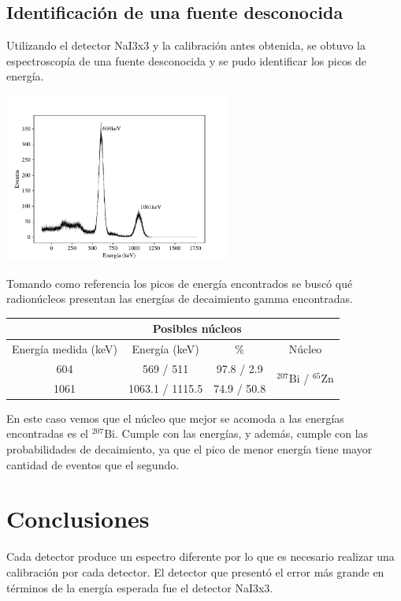 \documentclass[a4paper, onecolumn]{article}
\begin{document}
		\subsection{Identificación de una fuente desconocida}
		Utilizando el detector NaI3x3 y la calibración antes obtenida, se obtuvo la espectroscopía de una fuente desconocida y se pudo identificar los picos de energía.
		\begin{center}
			\includegraphics[width=210pt]{img/unknown_source.pdf}
		\end{center}

		Tomando como referencia los picos de energía encontrados se buscó qué radionúcleos presentan las energías de decaimiento gamma encontradas.

		\begin{center}
			{\renewcommand{\arraystretch}{1.5}
			\renewcommand{\tabcolsep}{0.2cm}
			\label{table_energy_resolution}
			\begin{tabular}{ c c c c }
				\hline
				& \multicolumn{2}{c}{Posibles núcleos} \\
				\hline
				Energía medida (keV) & Energía (keV) & \% & Núcleo \\
				\hline
				604 & 569 / 511 & 97.8 / 2.9 & \multirow{2}{*}{${}^{207}\mathrm{Bi}$ / ${}^{65}\mathrm{Zn}$}  \\
				1061 & 1063.1 / 1115.5 & 74.9 / 50.8 &  \\
				\hline
			\end{tabular}}
		\end{center}

		En este caso vemos que el núcleo que mejor se acomoda a las energías encontradas es el ${}^{207}\mathrm{Bi}$. Cumple con las energías, y además, cumple con las probabilidades de decaimiento, ya que el pico de menor energía tiene mayor cantidad de eventos que el segundo.
	\section{Conclusiones}
		Cada detector produce un espectro diferente por lo que es necesario realizar una calibración por cada detector. El detector que presentó el error más grande en términos de la energía esperada fue el detector NaI3x3.
\end{document}
